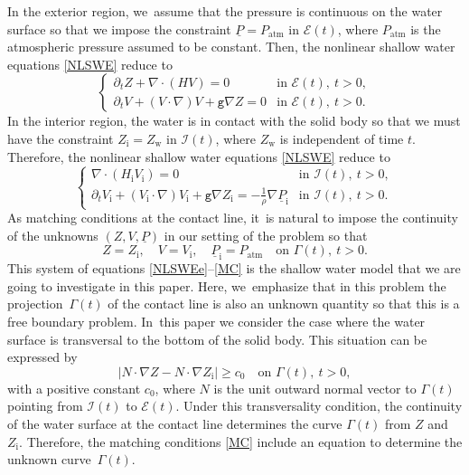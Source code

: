 \documentclass[10pt]{amsart}
\newcommand{\gr}{{\mathtt g}}
\newcommand{\dt}{\partial_t}
\newcommand{\cI}{{\mathcal I}}
\newcommand{\cE}{{\mathcal E}}
\newcommand{\ul}[1]{\underline{#1}}
\newcommand{\itGamma}{\mathit{\Gamma}}
\theoremstyle{definition}
\begin{document}
In the exterior region, we~assume that the pressure is continuous on the water surface so that we impose the constraint $\ul{P}=P_\mathrm{atm}$ in $\cE(t)$,
where $P_\mathrm{atm}$ is the atmospheric pressure assumed to be constant.
Then, the nonlinear shallow water equations \eqref{NLSWE} reduce to
\begin{equation}\label{NLSWEe}
\begin{cases}
\dt Z+\nabla\cdot(HV) = 0 &\text{in } \cE(t), \ t>0, \\
\dt V+(V\cdot\nabla)V+\gr\nabla Z = 0 &\text{in } \cE(t), \ t>0.
\end{cases}
\end{equation}
In the interior region, the water is in contact with the solid body so that we must have the constraint $Z_\mathrm{i}=Z_\mathrm{w}$ in $\cI(t)$,
where $Z_\mathrm{w}$ is independent of time $t$.
Therefore, the nonlinear shallow water equations \eqref{NLSWE} reduce to
\begin{equation}\label{NLSWEi}
\begin{cases}
\nabla\cdot(H_\mathrm{i}V_\mathrm{i}) = 0 &\text{in } \cI(t), \ t>0, \\
\dt V_\mathrm{i}+(V_\mathrm{i}\cdot\nabla)V_\mathrm{i}+\gr\nabla Z_\mathrm{i} = -\frac{1}{\rho}\nabla\ul{P}_\mathrm{i} &\text{in } \cI(t), \ t>0.
\end{cases}
\end{equation}
As matching conditions at the contact line, it~is natural to impose the continuity of the unknowns $(Z,V,\ul{P})$ in our setting of the problem so that
\begin{equation}\label{MC}
Z=Z_\mathrm{i}, \quad V=V_\mathrm{i}, \quad \ul{P}_\mathrm{i}=P_\mathrm{atm} \quad\text{on } \itGamma(t), \ t>0.
\end{equation}
This system of equations \eqref{NLSWEe}--\eqref{MC} is the shallow water model that we are going to investigate in this paper.
Here, we~emphasize that in this problem the projection~$\itGamma(t)$ of the contact line is also an unknown quantity so that this is a free boundary problem. In~this paper we consider the case where the water surface is transversal to the bottom of the solid body.
This situation can be expressed by
\begin{equation}\label{TransCond}
|N\cdot\nabla Z-N\cdot\nabla Z_\mathrm{i}| \geq c_0 \quad\text{on } \itGamma(t), \ t>0,
\end{equation}
with a positive constant $c_0$, where $N$ is the unit outward normal vector to $\itGamma(t)$ pointing from $\cI(t)$ to $\cE(t)$.
Under this transversality condition, the continuity of the water surface at the contact line determines the curve $\itGamma(t)$ from $Z$ and $Z_\mathrm{i}$.
Therefore, the matching conditions \eqref{MC} include an equation to determine the unknown curve~$\itGamma(t)$.
\end{document}
